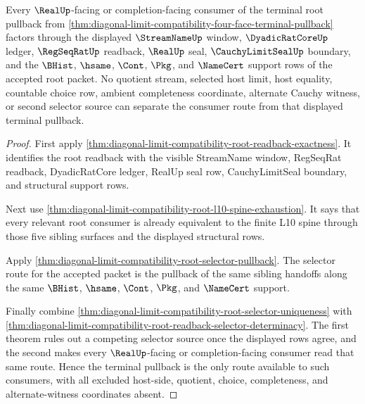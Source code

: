 \begin{theorem}
\label{thm:diagonal-limit-compatibility-terminal-pullback-consumer-nonescape}
Every $\RealUp$-facing or completion-facing consumer of the terminal root pullback from \autoref{thm:diagonal-limit-compatibility-four-face-terminal-pullback} factors through the displayed $\StreamNameUp$ window, $\DyadicRatCoreUp$ ledger, $\RegSeqRatUp$ readback, $\RealUp$ seal, $\CauchyLimitSealUp$ boundary, and the $\BHist$, $\hsame$, $\Cont$, $\Pkg$, and $\NameCert$ support rows of the accepted root packet. No quotient stream, selected host limit, host equality, countable choice row, ambient completeness coordinate, alternate Cauchy witness, or second selector source can separate the consumer route from that displayed terminal pullback.
\end{theorem}
\begin{proof}
First apply \autoref{thm:diagonal-limit-compatibility-root-readback-exactness}. It identifies the root readback with the visible StreamName window, RegSeqRat readback, DyadicRatCore ledger, RealUp seal row, CauchyLimitSeal boundary, and structural support rows.

Next use \autoref{thm:diagonal-limit-compatibility-root-l10-spine-exhaustion}. It says that every relevant root consumer is already equivalent to the finite L10 spine through those five sibling surfaces and the displayed structural rows.

Apply \autoref{thm:diagonal-limit-compatibility-root-selector-pullback}. The selector route for the accepted packet is the pullback of the same sibling handoffs along the same $\BHist$, $\hsame$, $\Cont$, $\Pkg$, and $\NameCert$ support.

Finally combine \autoref{thm:diagonal-limit-compatibility-root-selector-uniqueness} with \autoref{thm:diagonal-limit-compatibility-root-readback-selector-determinacy}. The first theorem rules out a competing selector source once the displayed rows agree, and the second makes every $\RealUp$-facing or completion-facing consumer read that same route. Hence the terminal pullback is the only route available to such consumers, with all excluded host-side, quotient, choice, completeness, and alternate-witness coordinates absent.
\end{proof}

